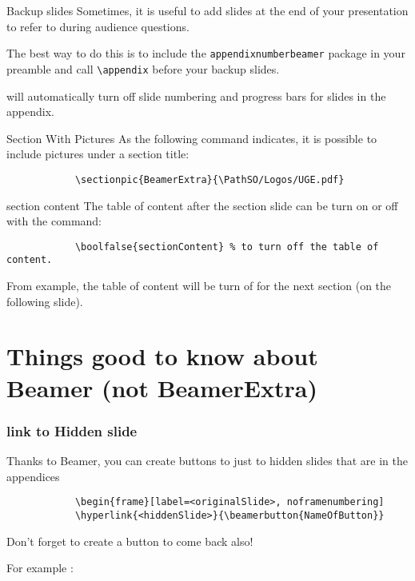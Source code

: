 	
	\begin{frame}[fragile]{Backup slides}
		Sometimes, it is useful to add slides at the end of your presentation to
		refer to during audience questions.
		
		The best way to do this is to include the \verb|appendixnumberbeamer|
		package in your preamble and call \verb|\appendix| before your backup slides.
		
		\themename will automatically turn off slide numbering and progress bars for
		slides in the appendix.
	\end{frame}
	
	\begin{frame}[fragile, label=previouSlide]{Section With Pictures}
		As the following command indicates, it is possible to include pictures under a section title:
		\begin{verbatim}			
			\sectionpic{BeamerExtra}{\PathSO/Logos/UGE.pdf}		
		\end{verbatim}
	\end{frame}

	\begin{frame}[fragile]{section content}
		The table of content after the section slide can be turn on or off with the command:
		\begin{verbatim}
			\boolfalse{sectionContent} % to turn off the table of content.
		\end{verbatim}
	
		From example, the table of content will be turn of for the next section (on the following slide).
	\end{frame}
	
\section{Things good to know about Beamer (not BeamerExtra)}
	
	\begin{frame}[fragile]
		\frametitle{link to Hidden slide}
		
		Thanks to Beamer, you can create buttons to just to hidden slides that are in the appendices
		\begin{verbatim}			
			\begin{frame}[label=<originalSlide>, noframenumbering]	
			\hyperlink{<hiddenSlide>}{\beamerbutton{NameOfButton}}
		\end{verbatim}
		
		Don't forget to create a button to come back also!
		
		For example :
		\hyperlink{previouSlide}{}
	\end{frame}
	
